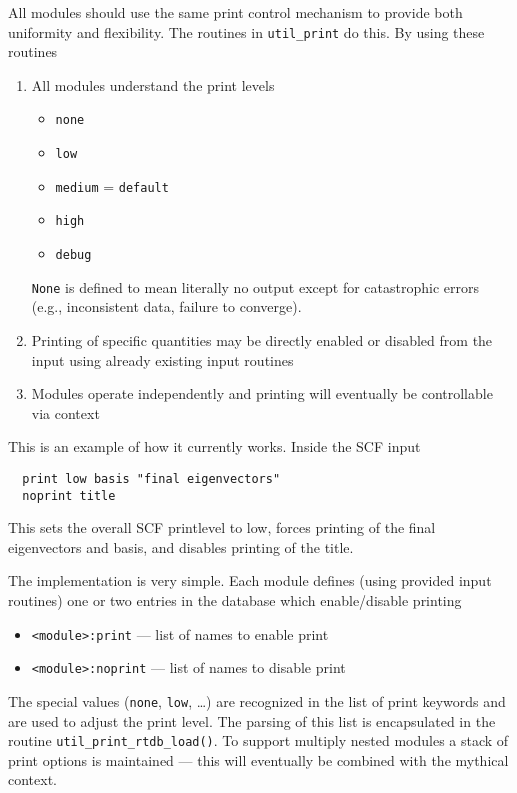\label{sec:print}

All modules should use the same print control mechanism to provide
both uniformity and flexibility.  The routines in \verb+util_print+ do
this.  By using these routines

\begin{enumerate}
\item All modules understand the print levels
\begin{itemize}
\item \verb+none+
\item \verb+low+
\item \verb+medium+ = \verb+default+
\item \verb+high+
\item \verb+debug+
\end{itemize}
\verb+None+ is defined to mean literally no output except for
catastrophic errors (e.g., inconsistent data, failure to converge).
\item Printing of specific quantities may be directly enabled or
  disabled from the input using already existing input routines
\item Modules operate independently and printing will eventually be
   controllable via context
\end{enumerate}

This is an example of how it currently works. Inside the SCF input
\begin{verbatim}
  print low basis "final eigenvectors"
  noprint title
\end{verbatim}
This sets the overall SCF printlevel to low, forces printing of the
final eigenvectors and basis, and disables printing of the title.

The implementation is very simple.  Each module defines (using
provided input routines) one or two entries in the database which
enable/disable printing
\begin{itemize}
\item \verb+<module>:print+ --- list of names to enable print
\item \verb+<module>:noprint+ --- list of names to disable print
\end{itemize}
The special values ({\tt none}, {\tt low}, \ldots) are recognized in
the list of print keywords and are used to adjust the print level.
The parsing of this list is encapsulated in the routine
\verb+util_print_rtdb_load()+.  To support multiply nested modules a
stack of print options is maintained --- this will eventually be
combined with the mythical context.

